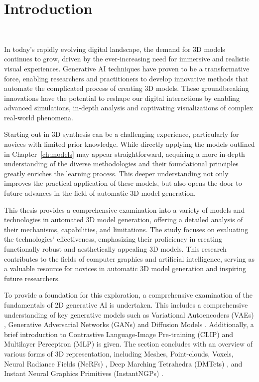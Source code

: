 \chapter{Introduction}~\label{ch:introduction}

In today's rapidly evolving digital landscape, the demand for 3D models continues to grow, driven by the ever-increasing need for immersive and realistic visual experiences. Generative AI techniques have proven to be a transformative force, enabling researchers and practitioners to develop innovative methods that automate the complicated process of creating 3D models. These groundbreaking innovations have the potential to reshape our digital interactions by enabling advanced simulations, in-depth analysis and captivating visualizations of complex real-world phenomena.

Starting out in 3D synthesis can be a challenging experience, particularly for novices with limited prior knowledge. While directly applying the models outlined in Chapter~\ref{ch:models} may appear straightforward, acquiring a more in-depth understanding of the diverse methodologies and their foundational principles greatly enriches the learning process. This deeper understanding not only improves the practical application of these models, but also opens the door to future advances in the field of automatic 3D model generation.

This thesis provides a comprehensive examination into a variety of models and technologies in automated 3D model generation, offering a detailed analysis of their mechanisms, capabilities, and limitations. The study focuses on evaluating the technologies' effectiveness, emphasizing their proficiency in creating functionally robust and aesthetically appealing 3D models. This research contributes to the fields of computer graphics and artificial intelligence, serving as a valuable resource for novices in automatic 3D model generation and inspiring future researchers.

To provide a foundation for this exploration, a comprehensive examination of the fundamentals of 2D generative AI is undertaken. This includes a comprehensive understanding of key generative models such as Variational Autoencoders (VAEs) \citep{kingmaVAE,rezendeVAE}, Generative Adversarial Networks (GANs) \citep{goodfellowGAN} and Diffusion Models \citep{yangdiffusionSummary,hoDDPMs, sohlDDPM}. Additionally, a brief introduction to Contrastive Language-Image Pre-training (CLIP) \citep{radfordCLIP} and Multilayer Perceptron (MLP) is given. The section concludes with an overview of various forms of 3D representation, including Meshes, Point-clouds, Voxels, Neural Radiance Fields (NeRFs) \citep{mildenhallNERF}, Deep Marching Tetrahedra (DMTets) \citep{shen2021DMTet}, and Instant Neural Graphics Primitives (InstantNGPs) \citep{M_ller_2022}.

